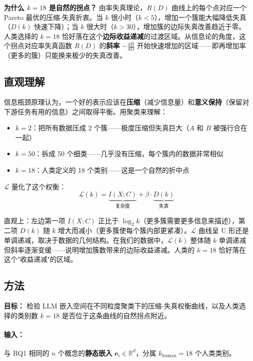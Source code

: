 \documentclass[11pt,a4paper]{article}
\begin{document}
\textbf{为什么 $k=18$ 是自然的拐点？} 由率失真理论，$R(D)$ 曲线上的每个点对应一个 Pareto 最优的压缩-失真折衷。当 $k$ 很小时（$k < 5$），增加一个簇能大幅降低失真（$D(k)$ 快速下降）；当 $k$ 很大时（$k > 30$），增加簇的边际失真改善趋近于零。人类选择的 $k=18$ 恰好落在这个\textbf{边际收益递减}的过渡区域。从信息论的角度，这个拐点对应率失真函数 $R(D)$ 的\textbf{斜率} $-\frac{dR}{dD}$ 开始快速增加的区域——即再增加率（更多的簇）只能换来极少的失真改善。

\subsection{直观理解}

信息瓶颈原理认为，一个好的表示应该在\textbf{压缩}（减少信息量）和\textbf{意义保持}（保留对下游任务有用的信息）之间取得平衡。用聚类来理解：

\begin{itemize}[noitemsep]
  \item $k=2$：把所有数据压成 2 个簇——极度压缩但失真巨大（$A$ 和 $B$ 被强行合在一起）
  \item $k=50$：拆成 50 个细类——几乎没有压缩，每个簇内的数据非常相似
  \item $k=18$：人类定义的 18 个类别——这是一个自然的折中点
\end{itemize}

$\mathcal{L}$ 量化了这个权衡：
\[
\mathcal{L}(k) = \underbrace{I(X;C)}_{\text{复杂度}} + \beta \cdot \underbrace{D(k)}_{\text{失真}}
\]

直观上：左边第一项 $I(X;C)$ 正比于 $\log_2 k$（更多簇需要更多信息来描述），第二项 $D(k)$ 随 $k$ 增大而减小（更多簇使每个簇内部更紧凑）。$\mathcal{L}$ 曲线呈 U 形还是单调递减，取决于数据的几何结构。在我们的数据中，$\mathcal{L}(k)$ 整体随 $k$ 单调递减但斜率逐渐变缓——说明增加簇数带来的边际收益递减。人类的 $k=18$ 恰好落在这个"收益递减"的区域。

\subsection{方法}

\textbf{目标：} 检验 LLM 嵌入空间在不同粒度聚类下的压缩-失真权衡曲线，以及人类选择的类别数 $k=18$ 是否位于这条曲线的自然拐点附近。

\paragraph{输入：} 与 RQ1 相同的 $n$ 个概念的\textbf{静态嵌入} $\mathbf{e}_i \in \mathbb{R}^d$，分属 $k_{\text{human}}=18$ 个人类类别。
\end{document}
